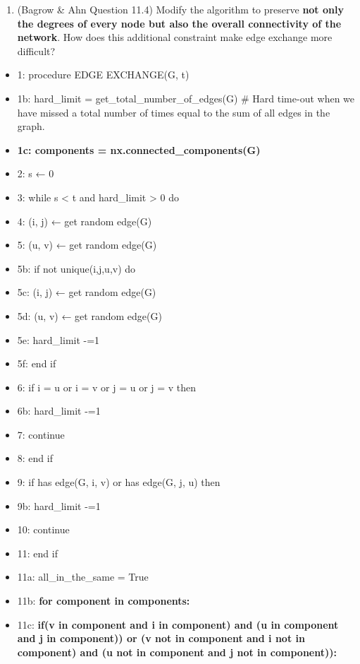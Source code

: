 \documentclass[11pt]{article}
\providecommand{\tightlist}{%
      \setlength{\itemsep}{0pt}\setlength{\parskip}{0pt}}
\begin{document}
    \begin{enumerate}
\def\labelenumi{(\alph{enumi})}
\setcounter{enumi}{2}
\tightlist
\item
  (Bagrow \& Ahn Question 11.4) Modify the algorithm to preserve
  \textbf{not only the degrees of every node but also the overall
  connectivity of the network}. How does this additional constraint make
  edge exchange more difficult?
\end{enumerate}

    \begin{itemize}
\tightlist
\item
  1: procedure EDGE EXCHANGE(G, t)
\item
  1b: hard\_limit = get\_total\_number\_of\_edges(G) \# Hard time-out
  when we have missed a total number of times equal to the sum of all
  edges in the graph.
\item
  \textbf{1c: components = nx.connected\_components(G)}
\item
  2: s ← 0
\item
  3: while s \textless{} t and hard\_limit \textgreater{} 0 do
\item
  4: (i, j) ← get random edge(G)
\item
  5: (u, v) ← get random edge(G)
\item
  5b: if not unique(i,j,u,v) do
\item
  5c: (i, j) ← get random edge(G)
\item
  5d: (u, v) ← get random edge(G)
\item
  5e: hard\_limit -=1
\item
  5f: end if
\item
  6: if i = u or i = v or j = u or j = v then
\item
  6b: hard\_limit -=1
\item
  7: continue
\item
  8: end if
\item
  9: if has edge(G, i, v) or has edge(G, j, u) then
\item
  9b: hard\_limit -=1
\item
  10: continue
\item
  11: end if
\item
  11a: all\_in\_the\_same = True
\item
  11b: \textbf{for component in components:}
\item
  11c: \textbf{if(v in component and i in component) and (u in component
  and j in component)) or (v not in component and i not in component)
  and (u not in component and j not in component)):}

\end{itemize}
\end{document}
